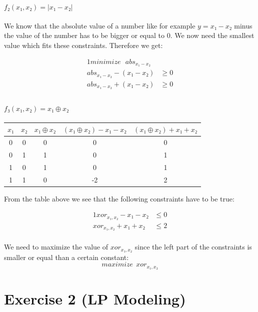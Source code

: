 \documentclass[a4paper, 12pt]{report}
\begin{document}
\paragraph{$f₂(x₁, x₂) = |x₁ − x₂|$}

We know that the absolute value of a number like for example $y = x₁ − x₂$ minus
the value of the number has to be bigger or equal to 0. We now need the
smallest value which fits these constraints. Therefore we get:

\begin{alignat*}{1}
    minimize ~~~ abs_{x₁ − x₂}\\
    abs_{x₁ − x₂} - (x₁ − x₂) &≥ 0\\
    abs_{x₁ − x₂} + (x₁ − x₂) &≥ 0\\
\end{alignat*}

\paragraph{$f₃(x₁, x₂) = x₁ ⊕ x₂$}

\begin{center}
    \begin{tabular}{ccccc}
        $x₁$ & $x₂$ & $x₁ ⊕ x₂$ & $(x₁ ⊕ x₂) -x₁-x₂$ & $(x₁ ⊕ x₂) +x₁+x₂$\\
        \hline
        0    & 0    & 0         & 0                   & 0\\
        0    & 1    & 1         & 0                   & 1\\
        1    & 0    & 1         & 0                   & 1\\
        1    & 1    & 0         & -2                  & 2\\
    \end{tabular}
\end{center}

From the table above we see that the following constraints have to be true:

\begin{alignat*}{1}
    xor_{x₁,x₂} -x₁-x₂   &≤ 0\\
    xor_{x₁,x₂} +x₁+x₂   &≤ 2\\
\end{alignat*}

We need to maximize the value of $xor_{x₁,x₂}$ since the left part of the
constraints is smaller or equal than a certain constant:
\[
    maximize ~~ xor_{x₁,x₂}
\]

\section{Exercise 2 (LP Modeling)}
\end{document}
